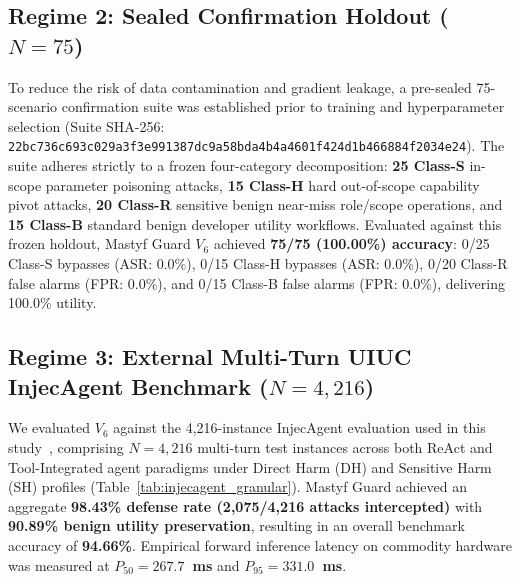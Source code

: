 \documentclass[10pt,journal,compsoc]{IEEEtran}
\begin{document}
\subsection{Regime 2: Sealed Confirmation Holdout ($N = 75$)}
To reduce the risk of data contamination and gradient leakage, a pre-sealed 75-scenario confirmation suite was established prior to training and hyperparameter selection (Suite SHA-256: \texttt{22bc736c693c029a3f3e991387dc9a58bda4b4a4601f424d1b466884f2034e24}). The suite adheres strictly to a frozen four-category decomposition: \textbf{25 Class-S} in-scope parameter poisoning attacks, \textbf{15 Class-H} hard out-of-scope capability pivot attacks, \textbf{20 Class-R} sensitive benign near-miss role/scope operations, and \textbf{15 Class-B} standard benign developer utility workflows. Evaluated against this frozen holdout, Mastyf Guard $V_6$ achieved \textbf{75/75 (100.00\%) accuracy}: 0/25 Class-S bypasses (ASR: 0.0\%), 0/15 Class-H bypasses (ASR: 0.0\%), 0/20 Class-R false alarms (FPR: 0.0\%), and 0/15 Class-B false alarms (FPR: 0.0\%), delivering 100.0\% utility.

\subsection{Regime 3: External Multi-Turn UIUC InjecAgent Benchmark ($N = 4,216$)}
We evaluated $V_6$ against the 4,216-instance InjecAgent evaluation used in this study~\cite{injecagent}, comprising $N = 4,216$ multi-turn test instances across both ReAct and Tool-Integrated agent paradigms under Direct Harm (DH) and Sensitive Harm (SH) profiles (Table~\ref{tab:injecagent_granular}). Mastyf Guard achieved an aggregate \textbf{98.43\% defense rate (2,075/4,216 attacks intercepted)} with \textbf{90.89\% benign utility preservation}, resulting in an overall benchmark accuracy of \textbf{94.66\%}. Empirical forward inference latency on commodity hardware was measured at \textbf{$P_{50} = 267.7$~ms} and \textbf{$P_{95} = 331.0$~ms}.
\end{document}
